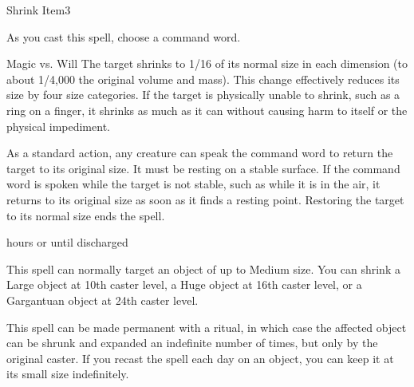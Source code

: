 \begin{spellsection}{Shrink Item}{3}
\begin{spellheader}
    \spellrng{\rngclose}
    \spellspecial As you cast this spell, choose a command word.
    \begin{spelltargetinginfo}
    \end{spelltargetinginfo}
\end{spellheader}
\begin{spellcontent}
    \begin{spelleffects}
        \begin{spellattack}{Magic vs. Will}
            \spellsuccess The target shrinks to 1/16 of its normal size in each dimension (to about 1/4,000 the original volume and mass). This change effectively reduces its size by four size categories. If the target is physically unable to shrink, such as a ring on a finger, it shrinks as much as it can without causing harm to itself or the physical impediment.

            As a standard action, any creature can speak the command word to return the target to its original size. It must be resting on a stable surface. If the command word is spoken while the target is not stable, such as while it is in the air, it returns to its original size as soon as it finds a resting point. Restoring the target to its normal size ends the spell.
        \end{spellattack}
         hours or until discharged
    \end{spelleffects}
\end{spellcontent}
\begin{spellfooter}
    \spellnotes This spell can normally target an object of up to Medium size. You can shrink a Large object at 10th caster level, a Huge object at 16th caster level, or a Gargantuan object at 24th caster level.
    \par This spell can be made permanent with a  ritual, in which case the affected object can be shrunk and expanded an indefinite number of times, but only by the original caster. If you recast the spell each day on an object, you can keep it at its small size indefinitely.
\end{spellfooter}
\end{spellsection}


